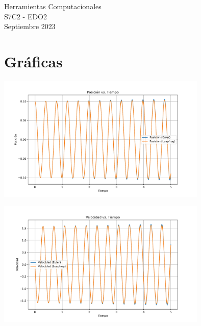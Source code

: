 \documentclass[11pt,letterpaper]{article}
\begin{document}
\begin{center}
{\Large Herramientas Computacionales} \\
S7C2 - \textsc{EDO2}\\
Septiembre 2023\\
\end{center}


\noindent
\section{Gr\'aficas}
\begin{center}
\includegraphics[width=10cm]{pos.pdf}
\end{center}  
\begin{center}
\includegraphics[width=10cm]{vel.pdf} 
\end{center}
\end{document}
